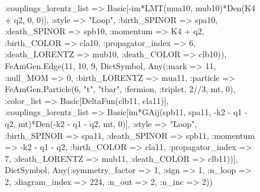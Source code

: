 \documentclass{revtex4}
\begin{document}
\begin{figure}[!htb]
\begin{center}
{:couplings_lorentz_list => Basic[-im*LMT(mua10, mub10)*Den(K4 + q2, 0, 0)], :style => "Loop", :birth_SPINOR => spa10, :death_SPINOR => spb10, :momentum => K4 + q2, :birth_COLOR => cla10, :propagator_index => 6, :death_LORENTZ => mub10, :death_COLOR => clb10)), FeAmGen.Edge(11, 10, 9, Dict{Symbol, Any}(:mark => 11, :null_MOM => 0, :birth_LORENTZ => mua11, :particle => FeAmGen.Particle(6, "t", "tbar", :fermion, :triplet, 2//3, mt, 0), :color_list => Basic[DeltaFun(clb11, cla11)], :couplings_lorentz_list => Basic[im*GAij(spb11, spa11, -k2 - q1 - q2, mt)*Den(-k2 - q1 - q2, mt, 0)], :style => "Loop", :birth_SPINOR => spa11, :death_SPINOR => spb11, :momentum => -k2 - q1 - q2, :birth_COLOR => cla11, :propagator_index => 7, :death_LORENTZ => mub11, :death_COLOR => clb11))], Dict{Symbol, Any}(:symmetry_factor => 1, :sign => 1, :n_loop => 2, :diagram_index => 224, :n_out => 2, :n_inc => 2)) 
}
\end{center}
\end{figure}
\end{document}
